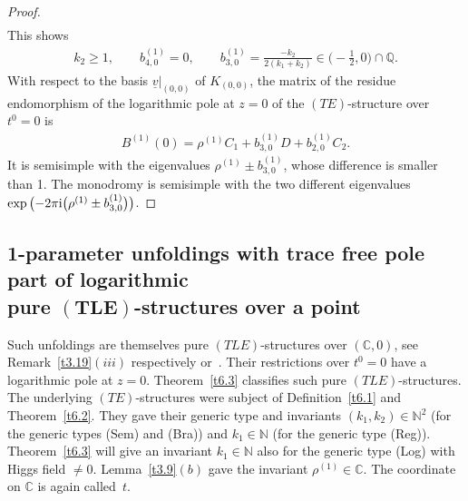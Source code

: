 \documentclass[pdftex]{sigma}%
\numberwithin{equation}{section}
\numberwithin{figure}{section}
\newcommand{\N}{{\mathbb N}}
\newcommand{\Q}{{\mathbb Q}}
\newcommand{\C}{{\mathbb C}}
\newcommand{\uuuu}{\underline}
\begin{document}
\begin{proof}
\begin{align*}
\end{align*}
This shows
\begin{gather*}%
k_2\geq 1,\qquad b_{4,0}^{(1)}=0,\qquad
b_{3,0}^{(1)}=\frac{-k_2}{2(k_1+k_2)}
\in \bigg({-}\frac{1}{2},0\bigg)\cap\Q.
\end{gather*}
With respect to the basis $\uuuu{v}|_{(0,0)}$ of $K_{(0,0)}$,
the matrix of the residue endomorphism of the
logarithmic pole at $z=0$ of the $(TE)$-structure over $t^0=0$
is
\begin{gather*}
B^{(1)}(0)= \rho^{(1)}C_1 + b_{3,0}^{(1)}D+b_{2,0}^{(1)}C_2.
\end{gather*}
It is semisimple with the eigenvalues
$\rho^{(1)}\pm b_{3,0}^{(1)}$, whose difference is smaller
than 1. The mono\-dromy is semisimple with the two different
eigenvalues $\exp\big({-}2\pi {\rm i}\big(\rho^{(1)}\pm b_{3,0}^{(1)}\big)\big)$.
\end{proof}


\subsection[1-parameter unfoldings with trace free pole part
of logarithmic pure $(TLE)$-structures over a point]
{1-parameter unfoldings with trace free pole part
of logarithmic \\pure $\boldsymbol{(TLE)}$-structures over a point}\label{c6.2}

Such unfoldings are themselves pure $(TLE)$-structures
over $(\C,0)$, see Remark~\ref{t3.19}$(iii)$ respectively
\cite[Chapter~VI, Theorem~2.1]{Sa02} or~\cite[Theorem~5.1(c)]{DH20-2}.
Their restrictions over $t^0=0$ have a logarithmic
pole at $z=0$.
Theorem~\ref{t6.3} classifies such pure $(TLE)$-structures.
The underlying $(TE)$-structures were subject of
Definition~\ref{t6.1} and Theorem~\ref{t6.2}.
They gave their generic type and
invariants $(k_1,k_2)\in\N^2$ (for the generic types
(Sem) and (Bra)) and $k_1\in\N$ (for the generic type (Reg)).
Theorem~\ref{t6.3} will give an invariant $k_1\in\N$ also
for the generic type (Log) with Higgs field $\neq 0$.
Lemma~\ref{t3.9}$(b)$ gave the invariant $\rho^{(1)}\in\C$.
The coordinate on $\C$ is again called~$t$.
\end{document}
